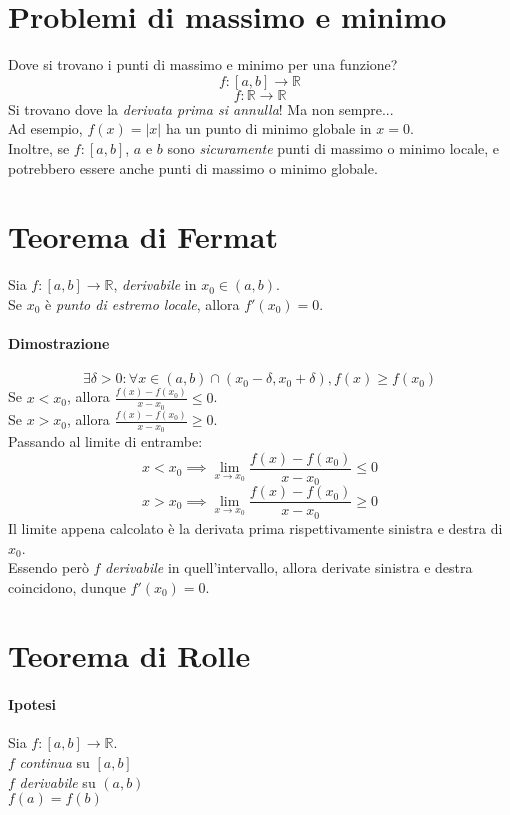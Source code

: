 \documentclass{article}
\begin{document}
\section{Problemi di massimo e minimo}
Dove si trovano i punti di massimo e minimo per una funzione?
\[f : [a, b] \to \mathbb{R}\]
\[f : \mathbb{R} \to \mathbb{R}\]
Si trovano dove la \textit{derivata prima si annulla}! Ma non sempre...\\
Ad esempio, \(f(x) = |x|\) ha un punto di minimo globale in \(x = 0\).\\
Inoltre, se \(f : [a, b]\), \(a\) e \(b\) sono \textit{sicuramente} punti di massimo o minimo locale, e potrebbero essere anche punti di massimo o minimo globale.

\section{Teorema di Fermat}
Sia \(f : [a, b] \to \mathbb{R}\), \textit{derivabile} in \(x_0 \in (a, b)\).\\
Se \(x_0\) è \textit{punto di estremo locale}, allora \(f'(x_0) = 0\).\\

\paragraph{Dimostrazione}
\[\exists \delta > 0 : \forall x \in (a, b) \cap (x_0 - \delta, x_0 + \delta), f(x) \geq f(x_0)\]
Se \(x < x_0\), allora \(\frac{f(x) - f(x_0)}{x - x_0} \leq 0\).\\
Se \(x > x_0\), allora \(\frac{f(x) - f(x_0)}{x - x_0} \geq 0\).\\
Passando al limite di entrambe:
\[x < x_0 \implies \lim_{x \to x_0} \frac{f(x) - f(x_0)}{x - x_0} \leq 0\]
\[x > x_0 \implies \lim_{x \to x_0} \frac{f(x) - f(x_0)}{x - x_0} \geq 0\]
Il limite appena calcolato è la derivata prima rispettivamente sinistra e destra di \(x_0\).\\
Essendo però \(f\) \textit{derivabile} in quell'intervallo, allora derivate sinistra e destra coincidono, dunque \(f'(x_0) = 0\).

\section{Teorema di Rolle}
\paragraph{Ipotesi}
Sia \(f : [a, b] \to \mathbb{R}\).\\
\(f\) \textit{continua} su \([a, b]\)\\
\(f\) \textit{derivabile} su \((a, b)\)\\
\(f(a) = f(b)\)
\end{document}
